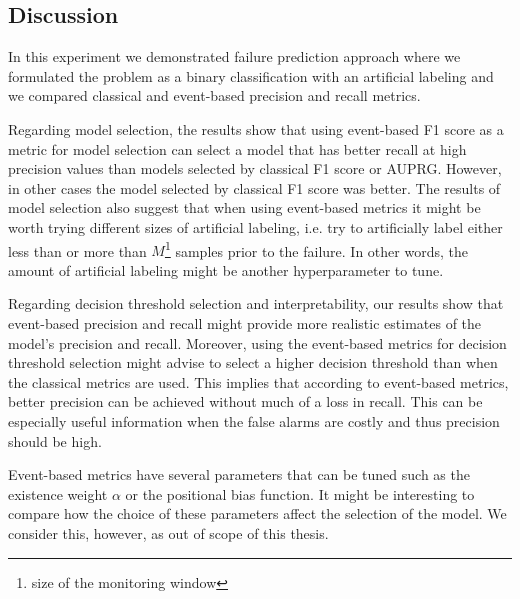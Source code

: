 \subsection{Discussion}

In this experiment we demonstrated failure prediction approach where we formulated the problem as a binary classification with an artificial labeling and we compared classical and event-based precision and recall metrics.

Regarding model selection, the results show that using event-based F1 score as a metric for model selection can select a model that has better recall at high precision values than models selected by classical F1 score or AUPRG.
However, in other cases the model selected by classical F1 score was better.
The results of model selection also suggest that when using event-based metrics it might be worth trying different sizes of artificial labeling, i.e. try to artificially label either less than or more than $M$\footnote{size of the monitoring window} samples prior to the failure.
In other words, the amount of artificial labeling might be another hyperparameter to tune.


Regarding decision threshold selection and interpretability, our results show that event-based precision and recall might provide more realistic estimates of the model's precision and recall.
Moreover, using the event-based metrics for decision threshold selection might advise to select a higher decision threshold than when the classical metrics are used.
This implies that according to event-based metrics, better precision can be achieved without much of a loss in recall.
This can be especially useful information when the false alarms are costly and thus precision should be high.

Event-based metrics have several parameters that can be tuned such as the existence weight $\alpha$ or the positional bias function.
It might be interesting to compare how the choice of these parameters affect the selection of the model.
We consider this, however, as out of scope of this thesis.


